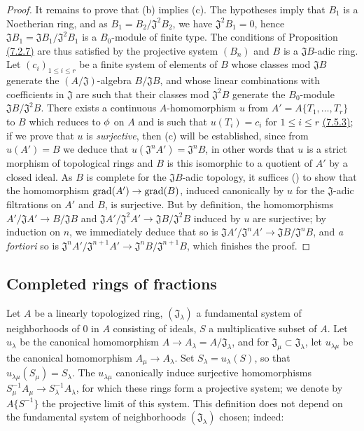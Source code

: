 \begin{proof}
It remains to prove that (b) implies (c). The hypotheses imply that $B_1$ is a Noetherian ring, and
as $B_1=B_2/\mathfrak{J}^2 B_2$, we have $\mathfrak{J}^2 B_1=0$, hence
$\mathfrak{J}B_1=\mathfrak{J}B_1/\mathfrak{J}^2 B_1$ is a $B_0$-module of finite type. The
conditions of Proposition \hyperref[0.7.2.7]{(7.2.7)} are thus satisfied by the projective
system $(B_n)$ and $B$ is a $\mathfrak{J}B$-adic ring. Let $(c_i)_{1\leqslant i\leqslant r}$ be a
finite system of elements of $B$ whose classes mod $\mathfrak{J}B$ generate the
$(A/\mathfrak{J})$-algebra $B/\mathfrak{J}B$, and whose linear combinations with coefficients in
$\mathfrak{J}$ are such that their classes mod $\mathfrak{J}^2 B$ generate the $B_0$-module
$\mathfrak{J}B/\mathfrak{J}^2 B$. There exists a continuous $A$-homomorphism $u$ from
$A'=A\{T_1,\dots,T_r\}$ to $B$ which reduces to $\phi$ on $A$ and is such that $u(T_i)=c_i$ for
$1\leqslant i\leqslant r$ \hyperref[0.7.5.3]{(7.5.3)}; if we prove that $u$ is {\em surjective},
then (c) will be established, since from $u(A')=B$ we deduce that
$u(\mathfrak{J}^n A')=\mathfrak{J}^n B$, in other words that $u$ is a strict morphism of topological
rings and $B$ is this isomorphic to a quotient of $A'$ by a closed ideal. As $B$ is complete for the
$\mathfrak{J}B$-adic topology, it suffices (\cite[p.~18--07]{I-1}) to show that the homomorphism
${\mathop{\mathrm{grad}}\nolimits}(A')\to{\mathop{\mathrm{grad}}\nolimits}(B)$, induced canonically by $u$ for the $\mathfrak{J}$-adic filtrations on
$A'$ and $B$, is surjective. But by definition, the homomorphisms
$A'/\mathfrak{J}A'\to B/\mathfrak{J}B$ and
$\mathfrak{J}A'/\mathfrak{J}^2 A'\to\mathfrak{J}B/\mathfrak{J}^2 B$ induced by $u$ are surjective;
by induction on $n$, we immediately deduce that so is
$\mathfrak{J}A'/\mathfrak{J}^n A'\to\mathfrak{J}B/\mathfrak{J}^n B$, and {\em a fortiori} so is
$\mathfrak{J}^n A'/\mathfrak{J}^{n+1}A'\to\mathfrak{J}^n B/\mathfrak{J}^{n+1}B$, which finishes the
proof.
\end{proof}

\subsection{Completed rings of fractions}
\label{subsection-completed-rings-of-fractions}

\begin{env}[7.6.1]
\label{0.7.6.1}
Let $A$ be a linearly topologized ring, $(\mathfrak{J}_\lambda)$ a fundamental system of
neighborhoods of $0$ in $A$ consisting of ideals, $S$ a multiplicative subset of $A$. Let
$u_\lambda$ be the canonical homomorphism $A\to A_\lambda=A/\mathfrak{J}_\lambda$, and for
$\mathfrak{J}_\mu\subset\mathfrak{J}_\lambda$, let $u_{\lambda\mu}$ be the canonical
homomorphism $A_\mu\to A_\lambda$. Set $S_\lambda=u_\lambda(S)$, so that
$u_{\lambda\mu}(S_\mu)=S_\lambda$. The $u_{\lambda\mu}$ canonically induce surjective
homomorphisms $S_\mu^{-1}A_\mu\to S_\lambda^{-1}A_\lambda$, for which these rings form a
projective system; we denote by $A\{S^{-1}\}$ the projective limit of this system. This
definition does not depend on the fundamental system of neighborhoods $(\mathfrak{J}_\lambda)$
chosen; indeed:
\end{env}

